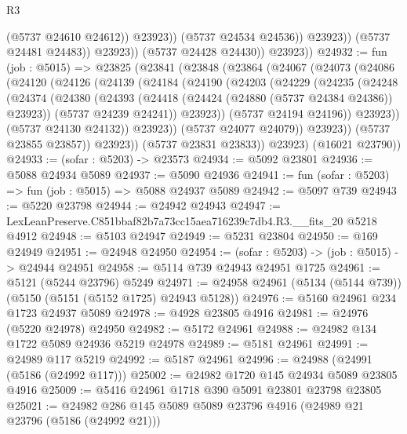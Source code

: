 \begin{lexlean}{R3}
\begin{coremodule}
                            (@5737 @24610 @24612))
                          @23923))
                      (@5737 @24534 @24536))
                    @23923))
                (@5737 @24481 @24483))
              @23923))
          (@5737 @24428 @24430))
        @23923))
@24932 := fun (job : @5015) =>
  @23825
    (@23841
      (@23848
        (@23864
          (@24067
            (@24073
              (@24086
                (@24120
                  (@24126
                    (@24139
                      (@24184
                        (@24190
                          (@24203
                            (@24229
                              (@24235
                                (@24248
                                  (@24374
                                    (@24380
                                      (@24393
                                        (@24418 (@24424 (@24880 (@5737 @24384 @24386)) @23923))
                                        (@5737 @24239 @24241))
                                      @23923))
                                  (@5737 @24194 @24196))
                                @23923))
                            (@5737 @24130 @24132))
                          @23923))
                      (@5737 @24077 @24079))
                    @23923))
                (@5737 @23855 @23857))
              @23923))
          (@5737 @23831 @23833))
        @23923)
      (@16021 @23790))
@24933 := (sofar : @5203) -> @23573
@24934 := @5092 @23801
@24936 := @5088 @24934 @5089
@24937 := @5090 @24936
@24941 := fun (sofar : @5203) => fun (job : @5015) => @5088 @24937 @5089
@24942 := @5097 @739
@24943 := @5220 @23798
@24944 := @24942 @24943
@24947 := LexLeanPreserve.C851bbaf82b7a73cc15aea716239c7db4.R3.__fits_20 @5218 @4912
@24948 := @5103 @24947
@24949 := @5231 @23804
@24950 := @169 @24949
@24951 := @24948 @24950
@24954 := (sofar : @5203) -> (job : @5015) -> @24944 @24951
@24958 := @5114 @739 @24943 @24951 @1725
@24961 := @5121 (@5244 @23796) @5249
@24971 := @24958 @24961 (@5134 (@5144 @739)) (@5150 (@5151 (@5152 @1725) @24943 @5128))
@24976 := @5160 @24961 @234 @1723 @24937 @5089
@24978 := @4928 @23805 @4916
@24981 := @24976 (@5220 @24978) @24950
@24982 := @5172 @24961
@24988 := @24982 @134 @1722 @5089 @24936 @5219 @24978
@24989 := @5181 @24961
@24991 := @24989 @117 @5219
@24992 := @5187 @24961
@24996 := @24988 (@24991 (@5186 (@24992 @117)))
@25002 := @24982 @1720 @145 @24934 @5089 @23805 @4916
@25009 := @5416 @24961 @1718 @390 @5091 @23801 @23798 @23805
@25021 := @24982 @286 @145 @5089 @5089 @23796 @4916 (@24989 @21 @23796 (@5186 (@24992 @21)))

\end{coremodule}
\end{lexlean}
